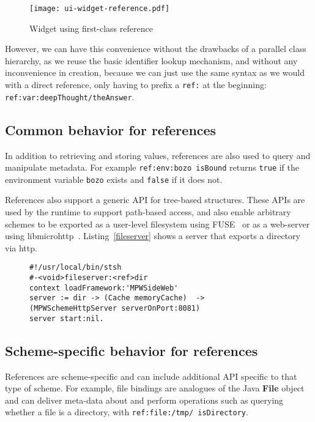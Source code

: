 \documentclass[preprint]{sigplanconf}
\begin{document}
\begin{figure}[htbp]
\centering
\texttt{[image: ui-widget-reference.pdf]}
\caption{Widget using first-class reference}
\label{ui-widget-reference}

\end{figure}

However, we can have this convenience without the drawbacks of a parallel class
hierarchy, as we reuse the basic identifier lookup mechanism, and without any
inconvenience in creation, because we can just use the same syntax as we would
with a direct reference, only having to prefix a {\tt ref:} at the beginning:  {\tt ref:var:deepThought/theAnswer}.


\subsection{Common behavior for references}
\label{common-reference-behavior}
In addition to retrieving and storing values, references are also used to query and manipulate
metadata.  For example {\tt ref:env:bozo isBound} returns {\tt true} if the environment
variable {\tt bozo} exists and {\tt false} if it does not.

References also support a generic API for tree-based structures.   These APIs are used
by the runtime to support path-based access, and also enable arbitrary
schemes to be exported as a user-level filesystem using FUSE~\cite{fuse} or as a web-server using libmicrohttp~\cite{libmicrohttp}.
Listing~\ref{fileserver} shows a server that exports a directory via http.

\vspace{-1.0em}
\begin{figure}[htbp]
\begin{lstlisting}[style=numbers,label=fileserver,caption=Exporting a directory via http.]
#!/usr/local/bin/stsh
#-<void>fileserver:<ref>dir
context loadFramework:'MPWSideWeb'
server := dir -> (Cache memoryCache)  ->  (MPWSchemeHttpServer serverOnPort:8081)
server start:nil.
\end{lstlisting}
\end{figure}

\vspace{-2.0em}


\subsection{Scheme-specific behavior for references}

References are scheme-specific and can include additional API specific to that type of scheme.
For example, file bindings are analogues of the Java {\bf File} object and can deliver
meta-data about and perform operations such as querying whether a file is a directory, with
{\tt ref:file:/tmp/ isDirectory}.
\end{document}
